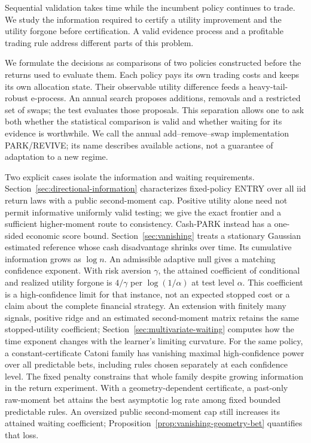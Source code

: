 \documentclass[11pt,a4paper]{article}
\theoremstyle{remark}\newtheorem{remark}[theorem]{Remark}
\begin{document}
Sequential validation takes time while the incumbent policy continues to
trade. We study the information required to certify a utility improvement and
the utility forgone before certification. A valid evidence process and a
profitable trading rule address different parts of this problem.

We formulate the decisions as comparisons of two policies constructed before
the returns used to evaluate them. Each policy pays its own trading costs and
keeps its own allocation state. Their observable utility difference feeds a
heavy-tail-robust e-process. An annual search proposes additions, removals and
a restricted set of swaps; the test evaluates those proposals. This separation
allows one to ask both whether the statistical comparison is valid and whether
waiting for its evidence is worthwhile.
We call the annual add--remove--swap implementation PARK/REVIVE; its name
describes available actions, not a guarantee of adaptation to a new regime.

Two explicit cases isolate the information and waiting requirements.
Section~\ref{sec:directional-information} characterizes fixed-policy ENTRY
over all iid return laws with a public second-moment cap. Positive utility
alone need not permit informative uniformly valid testing; we give the exact
frontier and a sufficient higher-moment route to consistency. Cash-PARK instead
has a one-sided economic score bound. Section~\ref{sec:vanishing} treats a
stationary Gaussian estimated reference whose cash disadvantage shrinks over
time. Its cumulative information grows as $\log n$. An admissible adaptive
null gives a matching confidence exponent. With risk aversion $\gamma$, the
attained coefficient of conditional and realized utility forgone is
$4/\gamma$ per $\log(1/\alpha)$ at test level $\alpha$.
This coefficient is a high-confidence limit for that instance, not an expected
stopped cost or a claim about the complete financial strategy.
An extension with finitely many signals, positive ridge and an estimated
second-moment matrix retains the same stopped-utility coefficient;
Section~\ref{sec:multivariate-waiting} computes how the time exponent changes
with the learner's limiting curvature.
For the same policy, a constant-certificate Catoni family has vanishing maximal
high-confidence power over all predictable bets, including rules chosen
separately at each confidence level. The fixed penalty constrains that whole
family despite growing information in the return experiment.
With a geometry-dependent certificate, a past-only raw-moment bet attains the
best asymptotic log rate among fixed bounded predictable rules. An oversized
public second-moment cap still increases its attained waiting coefficient;
Proposition~\ref{prop:vanishing-geometry-bet} quantifies that loss.
\end{document}
